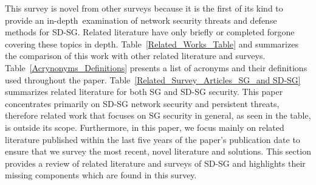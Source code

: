 \documentclass[conference]{IEEEtran}
\begin{document}
This survey is novel from other surveys because it is the first of its kind to provide an in-depth examination of network security threats and defense methods for SD-SG. Related literature have only briefly or completed forgone covering these topics in depth. Table~\ref{Related_Works_Table} and  summarizes the comparison of this work with other related literature and surveys.
Table~\ref{Acrynonyms_Definitions} presents a list of acronyms and their definitions used throughout the paper.
Table~\ref{Related_Survey_Articles_SG_and SD-SG} summarizes related literature for both SG and SD-SG security. This paper concentrates primarily on SD-SG network security and persistent threats, therefore related work that focuses on SG security in general, as seen in the table, is outside its scope. Furthermore, in this paper, we focus mainly on related literature published within the last five years of the paper's publication date to ensure that we survey the most recent, novel literature and solutions. This section provides a review of related literature and surveys of SD-SG and highlights their missing components which are found in this survey.
\end{document}
